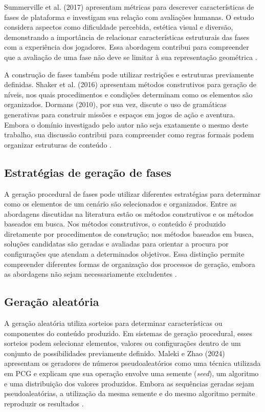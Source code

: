 Summerville et al. (2017) apresentam métricas para
descrever características de fases de plataforma e
investigam sua relação com avaliações humanas. O estudo
considera aspectos como dificuldade percebida, estética
visual e diversão, demonstrando a importância de
relacionar características estruturais das fases com
a experiência dos jogadores. Essa abordagem contribui
para compreender que a avaliação de uma fase não deve
se limitar à sua representação geométrica
\cite{Summerville2017}.

A construção de fases também pode utilizar restrições
e estruturas previamente definidas. Shaker et al. (2016)
apresentam métodos construtivos para geração de níveis,
nos quais procedimentos e condições determinam como
os elementos são organizados. Dormans (2010), por sua
vez, discute o uso de gramáticas generativas para
construir missões e espaços em jogos de ação e aventura.
Embora o domínio investigado pelo autor não seja
exatamente o mesmo deste trabalho, sua discussão
contribui para compreender como regras formais podem
organizar estruturas de conteúdo
\cite{ShakerConstructive2016,Dormans2010}.
\subsection{Estratégias de geração de fases}

A geração procedural de fases pode utilizar diferentes
estratégias para determinar como os elementos de um
cenário são selecionados e organizados. Entre as
abordagens discutidas na literatura estão os métodos
construtivos e os métodos baseados em busca. Nos métodos
construtivos, o conteúdo é produzido diretamente por
procedimentos de construção; nos métodos baseados em
busca, soluções candidatas são geradas e avaliadas
para orientar a procura por configurações que atendam
a determinados objetivos. Essa distinção permite compreender 
diferentes formas de organização dos processos de geração, embora 
as abordagens não sejam necessariamente excludentes 
\cite{ShakerConstructive2016,TogeliusSearch2016,Togelius2011}.

\subsection{Geração aleatória}

A geração aleatória utiliza sorteios para determinar
características ou componentes do conteúdo produzido.
Em sistemas de geração procedural, esses sorteios
podem selecionar elementos, valores ou configurações
dentro de um conjunto de possibilidades previamente
definido. Maleki e Zhao (2024) apresentam os geradores
de números pseudoaleatórios como uma técnica utilizada
em PCG e explicam que sua operação envolve uma semente
(\textit{seed}), um algoritmo e uma distribuição dos
valores produzidos. Embora as sequências geradas sejam
pseudoaleatórias, a utilização da mesma semente e do
mesmo algoritmo permite reproduzir os resultados
\cite{MalekiZhao2024}.

